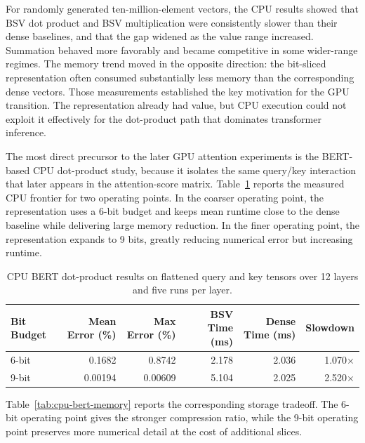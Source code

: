 For randomly generated ten-million-element vectors, the CPU results showed that BSV dot product and BSV multiplication were consistently slower than their dense baselines, and that the gap widened as the value range increased. Summation behaved more favorably and became competitive in some wider-range regimes. The memory trend moved in the opposite direction: the bit-sliced representation often consumed substantially less memory than the corresponding dense vectors. Those measurements established the key motivation for the GPU transition. The representation already had value, but CPU execution could not exploit it effectively for the dot-product path that dominates transformer inference.

The most direct precursor to the later GPU attention experiments is the BERT-based CPU dot-product study, because it isolates the same query/key interaction that later appears in the attention-score matrix. Table~\ref{tab:cpu-bert-runtime} reports the measured CPU frontier for two operating points. In the coarser operating point, the representation uses a 6-bit budget and keeps mean runtime close to the dense baseline while delivering large memory reduction. In the finer operating point, the representation expands to 9 bits, greatly reducing numerical error but increasing runtime.

\begin{table}[H]
\centering
\caption{CPU BERT dot-product results on flattened query and key tensors over 12 layers and five runs per layer.}
\label{tab:cpu-bert-runtime}
\begin{tabular}{lrrrrr}
\toprule
Bit Budget & Mean Error (\%) & Max Error (\%) & BSV Time (ms) & Dense Time (ms) & Slowdown \\
\midrule
6-bit & 0.1682 & 0.8742 & 2.178 & 2.036 & 1.070$\times$ \\
9-bit & 0.00194 & 0.00609 & 5.104 & 2.025 & 2.520$\times$ \\
\bottomrule
\end{tabular}
\end{table}

Table~\ref{tab:cpu-bert-memory} reports the corresponding storage tradeoff. The 6-bit operating point gives the stronger compression ratio, while the 9-bit operating point preserves more numerical detail at the cost of additional slices.

